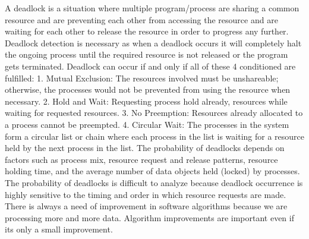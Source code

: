 \documentclass[sigplan,screen]{acmart}
\begin{document}
A deadlock is a situation where multiple program/process are sharing a common resource and are preventing each other from accessing the resource and are waiting for each other to release the resource in order to progress any further. Deadlock detection is necessary as when a deadlock occurs it will completely halt the ongoing process until the required resource is not released or the program gets terminated. Deadlock can occur if and only if all of these 4 conditioned are fulfilled: 1. Mutual Exclusion: The resources involved must be unshareable; otherwise, the processes would not be prevented from using the resource when necessary. 2. Hold and Wait: Requesting process hold already, resources while waiting for requested resources. 3. No Preemption: Resources already allocated to a process cannot be preempted. 4. Circular Wait: The processes in the system form a circular list or chain where each process in the list is waiting for a resource held by the next process in the list.
 The probability of deadlocks depends on factors such as process mix, resource request and release patterns, resource holding time, and the average number of data objects held (locked) by processes. The probability of deadlocks is difficult to analyze because deadlock occurrence is highly sensitive to the timing and order in which resource requests are made. There is always a need of improvement in software algorithms because we are processing more and more data. Algorithm improvements are important even if its only a small improvement.
\end{document}
